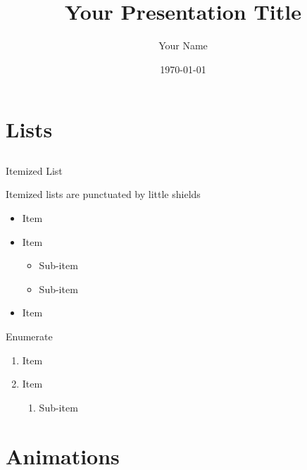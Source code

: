 \documentclass[12pt]{beamer}
\title[Short title]{Your Presentation Title}
\author{Your Name}
\institute[]{McMaster University}
\date{\today}
\begin{document}

\maketitle



\section{Lists}
\subsection{}
\begin{frame}{Itemized List}

	Itemized lists are punctuated by little shields

	\begin{itemize}
		\item Item
		\item Item
			\begin{itemize}
				\item Sub-item
				\item Sub-item
			\end{itemize}
		\item Item
	\end{itemize}

\end{frame}



\begin{frame}{Enumerate}

	\begin{enumerate}
		\item Item
		\item Item
			\begin{enumerate}
				\item Sub-item
			\end{enumerate}
	\end{enumerate}

\end{frame}



\section{Animations}
\end{document}
